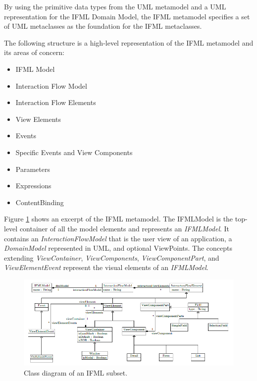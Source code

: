 By using the primitive data types from the UML metamodel and a UML representation for the IFML Domain Model, the IFML metamodel specifies a set of UML metaclasses as the foundation for the IFML metaclasses.

\newpage
The following structure is a high-level representation of the IFML metamodel and its areas of concern:

\begin{itemize}
  \item IFML Model
  \item Interaction Flow Model
  \item Interaction Flow Elements
  \item View Elements
  \item Events
  \item Specific Events and View Components
  \item Parameters
  \item Expressions
  \item ContentBinding
\end{itemize}

Figure \ref{fig:simple-ifml-core-model} shows an excerpt of the IFML metamodel. The IFMLModel is the top-level container of all the model elements and represents an \textit{IFMLModel}. It contains an \textit{InteractionFlowModel} that is the user view of an application, a \textit{DomainModel} represented in UML, and optional ViewPoints. The concepts extending \textit{ViewContainer}, \textit{ViewComponents}, \textit{ViewComponentPart}, and \textit{ViewElementEvent} represent the visual elements of an \textit{IFMLModel}.

\vspace{0.5cm}
\begin{figure}[H]
  \centering
    \includegraphics[width=15cm]{images/diagrams/ifml-metamodel.png}
  \caption{Class diagram of an IFML subset.}
  \label{fig:simple-ifml-core-model}
\end{figure}
\vspace{0.5cm}

